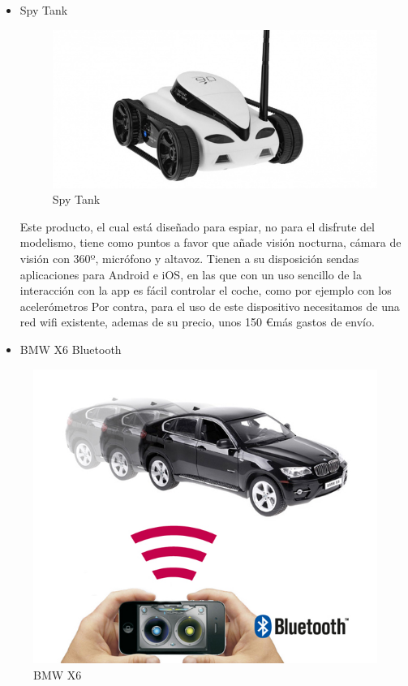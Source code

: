 \documentclass{pclass}
\begin{document}
\begin{itemize}
    \item Spy Tank


\begin{figure}[H]
  \centering
    \includegraphics[width=1.1\textwidth]{img/producto1}
  \caption{Spy Tank}
  \label{fig:SpyTank}
\end{figure}



Este producto, el cual está diseñado para espiar, no para el disfrute del modelismo, tiene como puntos a favor que añade visión nocturna, cámara de visión con 360º, micrófono y altavoz. Tienen a su disposición sendas aplicaciones para Android e iOS, en las que con un uso sencillo de la interacción con la app es fácil controlar el coche, como por ejemplo con los acelerómetros Por contra, para el uso de este dispositivo necesitamos de una red wifi existente, ademas de su precio, unos 150 \euro más gastos de envío.



    \item BMW X6 Bluetooth
\end{itemize}

\begin{figure}[H]
  \centering
    \includegraphics[width=1.1\textwidth]{img/producto2}
  \caption{BMW X6}
  \label{fig:BMWX6}
\end{figure}
\end{document}
